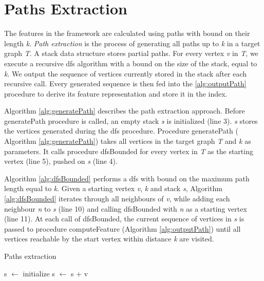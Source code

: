 \documentclass{l4proj}
\begin{document}
\section{Paths Extraction}
\label{sec:pathsExtraction}
The features in the framework are calculated using paths with bound on their length \emph{k}. \emph{Path extraction} is the process of generating all paths up to \emph{k} in a target graph \emph{T}. A stack data structure stores partial paths. For every vertex \emph{v} in \emph{T}, we execute a recursive \gls{dfs} algorithm with a bound on the size of the stack, equal to \emph{k}. We output the sequence of vertices currently stored in the stack after each recursive call. Every generated sequence is then fed into the \ref{alg:outputPath} procedure to derive its feature representation and store it in the index.

Algorithm \ref{alg:generatePath} describes the path extraction approach. Before generatePath procedure is called, an empty stack \emph{s} is initialized (line 3). \emph{s} stores the vertices generated during the \gls{dfs} procedure. Procedure generatePath ( \textrm{Algorithm \ref{alg:generatePath}}) takes all vertices in the target graph \emph{T} and \emph{k} as parameters. It calls procedure dfsBounded for every vertex in \emph{T} as the starting vertex (line 5), pushed on \emph{s} (line 4).

Algorithm \ref{alg:dfsBounded} performs a \gls{dfs} with bound on the maximum path length equal to \emph{k}. Given a starting vertex \emph{v}, \emph{k} and stack \emph{s}, Algorithm \ref{alg:dfsBounded} iterates through all neighbours of \emph{v}, while adding each neighbour \emph{n} to \emph{s} (line 10) and calling dfsBounded with \emph{n} as a starting vertex (line 11). At each call of dfsBounded, the current sequence of vertices in \emph{s} is passed to procedure computeFeature (Algorithm \ref{alg:outputPath}) until all vertices reachable by the start vertex within distance \emph{k} are visited.

\begin{algorithm}
\centering
\caption{Paths extraction}
\label{alg:generatePath}
\begin{algorithmic}[1]
	\State s $\gets$ initialize 
	\State s $\gets$ s + v 
	\State {}
\EndFor
\EndProcedure
\end{algorithmic}
\end{algorithm}
\end{document}
